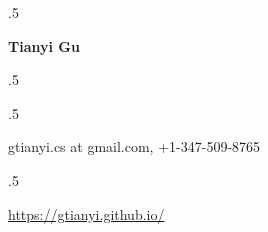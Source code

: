 \documentclass[margin, 10pt]{res} %
\begin{document}

\moveleft.5\hoffset\centerline{\large\bf Tianyi Gu}
\moveleft.5\hoffset\centerline{} 


 \moveleft.5\hoffset\centerline{gtianyi.cs at gmail.com, +1-347-509-8765}
 \moveleft.5\hoffset\centerline{\url{https://gtianyi.github.io/}}
\end{document}
